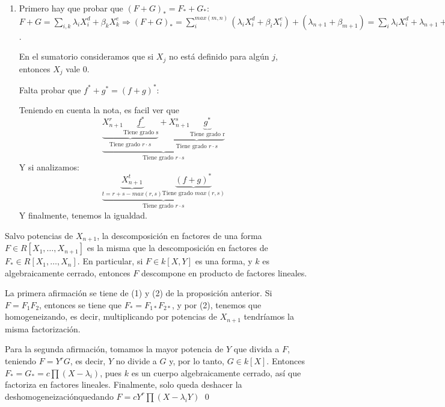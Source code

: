 \begin{Dem}
\begin{enumerate}
  \item Primero hay que probar que $(F+G)_*=F_*+G_*$: $F+G=\sum_{i,k}\lambda_iX_i^d+\beta_kX_k^e \Rightarrow (F+G)_*=\sum_{i}^{max(m,n)}(\lambda_iX_i^d+\beta_iX_i^e) + (\lambda_{n+1}+\beta_{m+1})=\sum_i \lambda_iX_i^d+\lambda_{n+1}+\sum_k\beta_kX_k^e+\beta_{n+1}=F^*+G^*$.
    \begin{nota}
      En el sumatorio consideramos que si $X_j$ no está definido para algún $j$, entonces $X_j$ vale 0.
    \end{nota}
    Falta probar que $f^*+g^*=(f+g)^*$:
    \begin{nota}
    \end{nota}
    Teniendo en cuenta la nota, es facil ver que
    $$\underbrace{\underbrace{X^r_{n+1}\underbrace{f^*}_{\text{Tiene grado s}}}_{\text{Tiene grado }r\cdot s}+\underbrace{X_{n+1}^s\underbrace{g^*}_{\text{Tiene grado r}}}_{\text{Tiene grado }r\cdot s}}_{\text{Tiene grado }r\cdot s}$$
    Y si analizamos:
    $$\underbrace{\underbrace{X_{n+1}^t}_{t=r+s-max(r,s)}\underbrace{(f+g)^*}_{\text{Tiene grado }max(r,s)}}_{\text{Tiene grado }r\cdot s} $$
    Y finalmente, tenemos la igualdad.
  \end{enumerate}

\end{Dem}



\begin{Cor}
Salvo potencias de $X_{n+1}$, la descomposición en factores de una forma $F\in R[X_1,\dots,X_{n+1}]$ es la misma que la descomposición en factores de $F_*\in R[X_1,\dots,X_n]$. En particular, si $F\in k[X,Y]$ es una forma, y $k$ es algebraicamente cerrado, entonces $F$ descompone en producto de factores lineales.
\end{Cor}

\begin{Dem}
  La primera afirmación se tiene de (1) y (2) de la proposición anterior. Si $F=F_1F_2$, entonces se tiene que $F_*=F_{1*}F_{2*}$, y por (2), tenemos que homogeneizando, es decir, multiplicando por potencias de $X_{n+1}$ tendríamos la misma factorización.

  Para la segunda afirmación, tomamos la mayor potencia de $Y$ que divida a $F$, teniendo $F=Y^rG$, es decir, $Y$ no divide a $G$ y, por lo tanto, $G\in k[X]$. Entonces $F_*=G_*=c\prod (X-\lambda_i)$, pues $k$ es un cuerpo algebraicamente cerrado, así que factoriza en factores lineales. Finalmente, solo queda deshacer la deshomogeneizaciónquedando $F=cY^r\prod(X-\lambda_iY)  $ \qed
\end{Dem}



